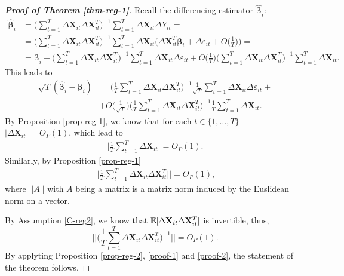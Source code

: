 \documentclass[a4paper,12pt]{article}
\begin{document}
\begin{proof}[\textnormal{\textbf{Proof of Theorem \ref{thm-reg-1}}}]
Recall the differencing estimator $\widehat{\bm{\beta}}_i$:
\begin{align*}
\widehat{\bm{\beta}}_i &= \Big( \sum_{t=1}^T \Delta \mathbf{X}_{it} \Delta \mathbf{X}_{it}^T \Big)^{-1} \sum_{t=1}^T \Delta \mathbf{X}_{it} \Delta Y_{it} =\\
& =  \Big( \sum_{t=1}^T \Delta \mathbf{X}_{it} \Delta \mathbf{X}_{it}^T \Big)^{-1} \sum_{t=1}^T \Delta \mathbf{X}_{it} \bigg(\Delta \mathbf{X}_{it}^T \bm{\beta}_i + \Delta \varepsilon_{it} + O\Big(\frac{1}{T}\Big) \bigg) =\\
&= \bm{\beta}_i +  \Big( \sum_{t=1}^T \Delta \mathbf{X}_{it} \Delta \mathbf{X}_{it}^T \Big)^{-1} \sum_{t=1}^T \Delta \mathbf{X}_{it} \Delta \varepsilon_{it}
+  O\Big(\frac{1}{T}\Big) \Big( \sum_{t=1}^T \Delta \mathbf{X}_{it} \Delta \mathbf{X}_{it}^T \Big)^{-1} \sum_{t=1}^T \Delta \mathbf{X}_{it}. 
\end{align*}
This leads to
\begin{align*}
\sqrt{T}( \widehat{\bm{\beta}}_i - \bm{\beta}_i) &=  \Big(\frac{1}{T} \sum_{t=1}^T \Delta \mathbf{X}_{it} \Delta \mathbf{X}_{it}^T \Big)^{-1}\frac{1}{\sqrt{T}} \sum_{t=1}^T \Delta \mathbf{X}_{it} \Delta \varepsilon_{it} +\\
&+  O\Big(\frac{1}{\sqrt{T}}\Big) \Big( \frac{1}{T}\sum_{t=1}^T \Delta \mathbf{X}_{it} \Delta \mathbf{X}_{it}^T \Big)^{-1} \frac{1}{T}\sum_{t=1}^T \Delta \mathbf{X}_{it}.
\end{align*}
By Proposition \ref{prop-reg-1}, we know that for each $t\in\{1, \ldots, T\}$ $|\Delta \mathbf{X}_{it}| = O_P(1)$, which lead to 
\begin{align}\label{proof-1}
\Big|\frac{1}{T}\sum_{t=1}^T\Delta \mathbf{X}_{it}\Big| = O_P(1).
\end{align}
Similarly, by Proposition \ref{prop-reg-1}
\begin{align}\label{proof-2}
\Big|\Big|\frac{1}{T}\sum_{t=1}^T\Delta \mathbf{X}_{it} \Delta \mathbf{X}_{it}^T\Big|\Big| = O_P(1),
\end{align}
where $||A||$ with $A$ being a matrix is a matrix norm induced by the Euslidean norm on a vector.

By Assumption \ref{C-reg2}, we know that $\mathbb{E} [\Delta \mathbf{X}_{it} \Delta \mathbf{X}_{it}^T]$ is invertible, thus, 
\[\Bigg| \Bigg| \Big(\frac{1}{T}\sum_{t=1}^T\Delta \mathbf{X}_{it} \Delta \mathbf{X}_{it}^T\Big)^{-1}\Bigg|\Bigg| = O_P(1).\]
By applyting Proposition \ref{prop-reg-2}, \eqref{proof-1} and \eqref{proof-2}, the statement of the theorem follows.
\end{proof}
\end{document}
